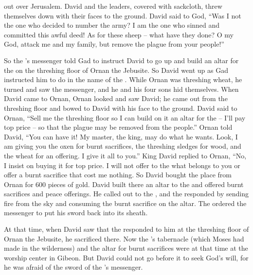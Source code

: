 {out over
Jerusalem.
David
and the leaders,
covered
with sackcloth,
threw
themselves down with their faces to the ground.
David
said
to
God,
“Was I
not
the one who decided
to number
the army? I
am the one who
sinned
and committed this awful
deed! As for these
sheep
– what
have they done? O
{}
my God,
attack me
and my family,
but
remove the plague
from your people!”
\par }{\PP {}So the
{}’s
messenger
told
Gad
to
instruct
David
to go up
and build
an altar
for the
{}
on the threshing floor
of Ornan
the Jebusite.
So David
went up
as
Gad
instructed
him to do
in the name
of the {}.
While Ornan
was threshing
wheat,
he turned
and saw
the messenger,
and he
and his four
sons
hid themselves.
When David
came
to
Ornan,
Ornan
looked
and saw
David;
he came out
from
the threshing floor
and bowed
to David
with his face
to the ground.
David
said
to
Ornan,
“Sell
me the threshing floor
so I can build
on it an altar
for the
{} –
I’ll pay
top price –
so that the plague
may be removed
from
the people.”
Ornan
told
David,
“You can have
it! My master,
the king,
may do
what he wants.
Look,
I am giving
you the oxen
for burnt sacrifices,
the threshing sledges
for wood,
and the wheat
for an offering.
I give
it all to you.”
King
David
replied
to Ornan,
“No,
I insist
on buying
it
for
top price.
I will not
offer to the
{}
what belongs to you or offer
a burnt sacrifice
that cost me nothing.
So David
bought
the place
from Ornan
for 600
pieces
of gold.
David
built
there
an altar
to the
{}
and offered
burnt sacrifices
and peace offerings.
He called
out to
the {}, and the
{} responded
by sending fire
from
the sky
and consuming the burnt sacrifice
on
the altar.
The
{}
ordered
the messenger
to put his sword
back
into its sheath.
\par }{\PP {}At that time,
when David
saw
that
the {}
responded
to him at the threshing floor
of Ornan
the Jebusite,
he sacrificed
there.
Now the
{}’s
tabernacle
(which
Moses
had made
in the wilderness) and the altar
for burnt sacrifices
were at that time
at the worship center
in Gibeon.
But David
could
not
go
before
it to seek
God’s
will, for
he was afraid
of the sword
of the
{}’s
messenger.

}
